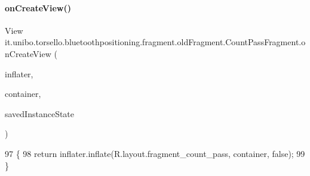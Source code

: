 \hypertarget{classit_1_1unibo_1_1torsello_1_1bluetoothpositioning_1_1fragment_1_1oldFragment_1_1CountPassFragment_a2c7d7b72b37f42ab65321dba532d10cb_a2c7d7b72b37f42ab65321dba532d10cb}{}\label{classit_1_1unibo_1_1torsello_1_1bluetoothpositioning_1_1fragment_1_1oldFragment_1_1CountPassFragment_a2c7d7b72b37f42ab65321dba532d10cb_a2c7d7b72b37f42ab65321dba532d10cb} 
\paragraph{\texorpdfstring{on\+Create\+View()}{onCreateView()}}
{\footnotesize\ttfamily View it.\+unibo.\+torsello.\+bluetoothpositioning.\+fragment.\+old\+Fragment.\+Count\+Pass\+Fragment.\+on\+Create\+View (\begin{DoxyParamCaption}\item[{Layout\+Inflater}]{inflater,  }\item[{View\+Group}]{container,  }\item[{Bundle}]{saved\+Instance\+State }\end{DoxyParamCaption})}


\begin{DoxyCode}
97                                                                                                       \{
98         \textcolor{keywordflow}{return} inflater.inflate(R.layout.fragment\_count\_pass, container, \textcolor{keyword}{false});
99     \}
\end{DoxyCode}
\hypertarget{classit_1_1unibo_1_1torsello_1_1bluetoothpositioning_1_1fragment_1_1oldFragment_1_1CountPassFragment_afae67ea2360d6a57e1e6bb3a1a8f2d83_afae67ea2360d6a57e1e6bb3a1a8f2d83}{}\label{classit_1_1unibo_1_1torsello_1_1bluetoothpositioning_1_1fragment_1_1oldFragment_1_1CountPassFragment_afae67ea2360d6a57e1e6bb3a1a8f2d83_afae67ea2360d6a57e1e6bb3a1a8f2d83} 
